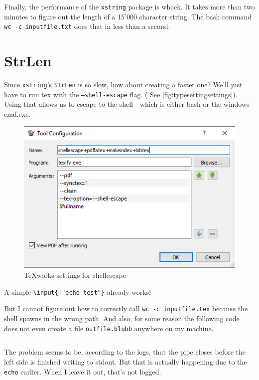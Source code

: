 \documentclass{article} \usepackage[utf8]{inputenc}
\begin{document}
Finally, the performance of the \texttt{xstring} package is whack. It takes more than two minutes to figure out the length of a 15'000 character string. The bash command \texttt{wc -c inputfile.txt} does that in less than a second.
\clearpage
\section{StrLen}
Since \texttt{xstring}'s \texttt{StrLen} is so slow, how about creating a faster one?
We'll just have to run tex with the \texttt{--shell-escape} flag. ( See \autoref{fig:typesettingsettings}). Using that allows us to escape to the shell - which is either bash or the windows cmd.exe.

\begin{figure}[htbp]
\includegraphics{typesettingsettings}
\caption{TeXworks settings for shellescape}
\label{fig:typesettingsettings}
\end{figure}

A simple \texttt{\textbackslash input\{|"echo test"\}} already works!


But I cannot figure out how to correctly call \texttt{wc -c inputfile.tex} because the shell spawns in the wrong path. And also, for some reason the following code does not even create a file \texttt{outfile.blubb} anywhere on my machine.
\begin{lstlisting}

\end{lstlisting}
The problem seems to be, according to the logs, that the pipe closes before the left side is finished writing to stdout. But that is actually happening due to the \texttt{echo} earlier. When I leave it out, that's not logged.
\end{document}
